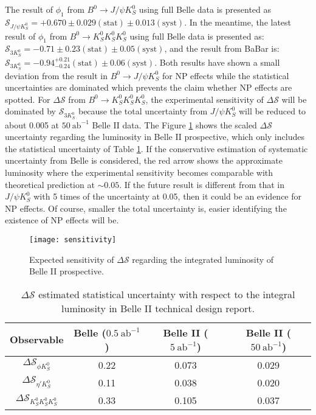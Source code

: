 The result of $\phi_1$ from $B^0 \to J/\psi K_S^0$ using full Belle data is presented as $\mathcal{S}_{J/\psi K^0_S} = + 0.670 \pm 0.029 (\text{stat}) \pm 0.013(\text{syst})$\cite{b2book}. In the meantime, the latest result of  $\phi_1$ from $B^0 \to K_S^0  K_S^0  K_S^0$ using full Belle data\cite{kang2020measurement} is presented as: $\mathcal{S}_{3K^0_S} = - 0.71 \pm 0.23 (\text{stat}) \pm 0.05(\text{syst})$, and the result from BaBar \cite{Lees:2011nf} is: $\mathcal{S}_{ 3K^0_S} = - 0.94 ^{+0.21}_{-0.24} (\text{stat}) \pm 0.06(\text{syst})$. Both results have shown a small deviation from the result in $B^0 \to J/\psi K_S^0$ for NP effects while the statistical uncertainties are dominated which prevents the claim whether NP effects are spotted. For $\Delta \mathcal{S}$ from $B^0 \to K_S^0  K_S^0  K_S^0$, the experimental sensitivity of $\Delta \mathcal{S}$ will be dominated by $\mathcal{S}_{3K^0_S}$ because the total uncertainty from $J/\psi K^0_S$ will be reduced to about 0.005 at $50 \: \text{ab}^{-1}$ Belle II data\cite{b2book}. The Figure \ref{fig:sensitivity} shows the scaled $\Delta \mathcal{S}$ uncertainty regarding the luminosity in Belle II prospective\cite{Abe:2010gxa}, which only includes the statistical uncertainty of Table \ref{tab:sensitivity}. If the conservative estimation of systematic uncertainty from Belle is considered, the red arrow shows the approximate luminosity where the experimental sensitivity becomes comparable with theoretical prediction at $\sim 0.05$. If the future result is different from that in $J/\psi K^0_S$ with 5 times of the uncertainty at 0.05, then it could be an evidence for NP effects. Of course, smaller the total uncertainty is, easier identifying the existence of NP effects will be.

\begin{figure}[H]
	\centering
	\texttt{[image: sensitivity]}
	\caption{Expected  sensitivity of $\Delta \mathcal{S}$ regarding the integrated luminosity of Belle II prospective.\cite{Abe:2010gxa}}
	\label{fig:sensitivity}
\end{figure}

\begin{table}[H]
	\centering
	\large
	\caption{$\Delta \mathcal{S}$ estimated statistical uncertainty with respect to the integral luminosity in Belle II technical design report\cite{Abe:2010gxa}.}
	\label{tab:sensitivity}
	\begin{tabular}{c c c c}
		\toprule
		Observable & Belle ($0.5 \: \text{ab}^{-1}$) & Belle II ($5 \: \text{ab}^{-1}$)& Belle II ($50 \: \text{ab}^{-1}$)\\
		\hline
		$\Delta \mathcal{S}_{\phi K^0_S}$ & 0.22 &  0.073 & 0.029\\
		$\Delta \mathcal{S}_{\eta' K^0_S}$   & 0.11 &  0.038 & 0.020\\
		$\Delta \mathcal{S}_{ K^0_S K^0_S K^0_S}$ & 0.33 & 0.105 & 0.037\\
		\bottomrule
	\end{tabular}
\end{table}

